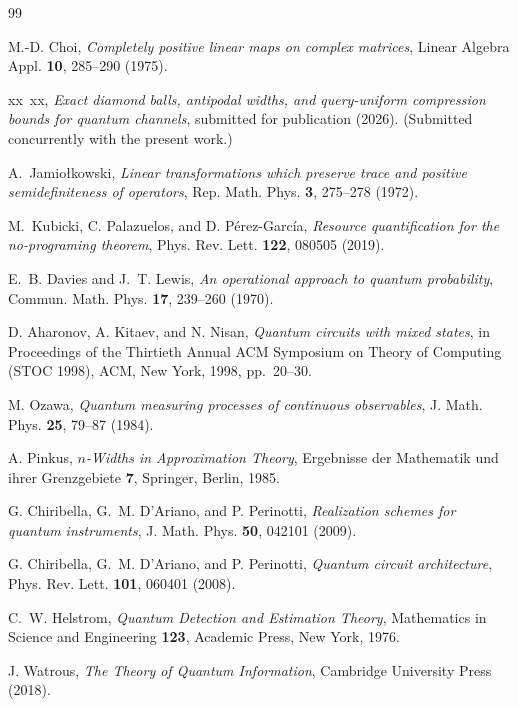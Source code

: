 \documentclass[11pt,a4paper]{article}
\begin{document}
\begin{thebibliography}{99}

M.-D. Choi, \emph{Completely positive linear maps on complex matrices}, Linear Algebra Appl. \textbf{10}, 285--290 (1975).

xx~xx, \emph{Exact diamond balls, antipodal widths, and query-uniform compression bounds for quantum channels}, submitted for publication (2026). (Submitted concurrently with the present work.)

A.~Jamio{\l}kowski, \emph{Linear transformations which preserve trace and positive semidefiniteness of operators}, Rep. Math. Phys. \textbf{3}, 275--278 (1972).

M.~Kubicki, C. Palazuelos, and D. P\'erez-Garc\'ia, \emph{Resource quantification for the no-programing theorem}, Phys. Rev. Lett. \textbf{122}, 080505 (2019).

E.~B. Davies and J.~T. Lewis, \emph{An operational approach to quantum probability}, Commun. Math. Phys. \textbf{17}, 239--260 (1970).

D. Aharonov, A. Kitaev, and N. Nisan, \emph{Quantum circuits with mixed states}, in Proceedings of the Thirtieth Annual ACM Symposium on Theory of Computing (STOC 1998), ACM, New York, 1998, pp.~20--30.

M. Ozawa, \emph{Quantum measuring processes of continuous observables}, J. Math. Phys. \textbf{25}, 79--87 (1984).

A. Pinkus, \emph{$n$-Widths in Approximation Theory}, Ergebnisse der Mathematik und ihrer Grenzgebiete \textbf{7}, Springer, Berlin, 1985.

G. Chiribella, G.~M. D'Ariano, and P. Perinotti, \emph{Realization schemes for quantum instruments}, J. Math. Phys. \textbf{50}, 042101 (2009).

G. Chiribella, G.~M. D'Ariano, and P. Perinotti, \emph{Quantum circuit architecture}, Phys. Rev. Lett. \textbf{101}, 060401 (2008).

C.~W. Helstrom, \emph{Quantum Detection and Estimation Theory}, Mathematics in Science and Engineering \textbf{123}, Academic Press, New York, 1976.

J. Watrous, \emph{The Theory of Quantum Information}, Cambridge University Press (2018).


\end{thebibliography}
\end{document}
